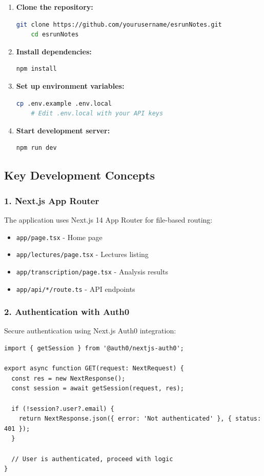 \documentclass[12pt,a4paper]{article}
\newcommand{\code}[1]{\texttt{#1}}
\begin{document}
\begin{enumerate}
    \item \textbf{Clone the repository:}
    \begin{lstlisting}[language=bash]
    git clone https://github.com/yourusername/esrunNotes.git
    cd esrunNotes
    \end{lstlisting}

    \item \textbf{Install dependencies:}
    \begin{lstlisting}[language=bash]
    npm install
    \end{lstlisting}

    \item \textbf{Set up environment variables:}
    \begin{lstlisting}[language=bash]
    cp .env.example .env.local
    # Edit .env.local with your API keys
    \end{lstlisting}

    \item \textbf{Start development server:}
    \begin{lstlisting}[language=bash]
    npm run dev
    \end{lstlisting}
\end{enumerate}

\subsection{Key Development Concepts}

\subsubsection{1. Next.js App Router}
The application uses Next.js 14 App Router for file-based routing:
\begin{itemize}
    \item \code{app/page.tsx} - Home page
    \item \code{app/lectures/page.tsx} - Lectures listing
    \item \code{app/transcription/page.tsx} - Analysis results
    \item \code{app/api/*/route.ts} - API endpoints
\end{itemize}

\subsubsection{2. Authentication with Auth0}
Secure authentication using Next.js Auth0 integration:
\begin{lstlisting}[caption=Auth0 Configuration]
import { getSession } from '@auth0/nextjs-auth0';

export async function GET(request: NextRequest) {
  const res = new NextResponse();
  const session = await getSession(request, res);

  if (!session?.user?.email) {
    return NextResponse.json({ error: 'Not authenticated' }, { status: 401 });
  }

  // User is authenticated, proceed with logic
}
\end{lstlisting}
\end{document}
